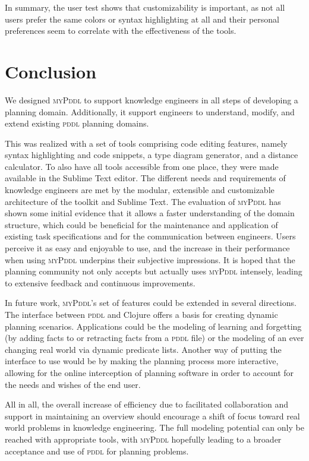 \documentclass[runningheads]{llncs}
\newcommand{\mypddl}{\textsc{myPddl}\xspace}
\newcommand{\pddl}{\textsc{pddl}\xspace}
\begin{document}
In summary, the user test shows that customizability is important, as
not all users prefer the same colors or syntax highlighting at all and
their personal preferences seem to correlate with the effectiveness of
the tools.


\section{Conclusion}
\label{sec:conclusion}

We designed \mypddl to support knowledge engineers in all steps of
developing a planning domain. Additionally, it support engineers to
understand, modify, and extend existing \pddl planning domains.

This was realized with a set of tools comprising code editing
features, namely syntax highlighting and code snippets, a type diagram
generator, and a distance calculator. To also have all tools
accessible from one place, they were made available in the Sublime
Text editor. The different needs and requirements of knowledge
engineers are met by the modular, extensible and customizable
architecture of the toolkit and Sublime Text. The evaluation of
\mypddl has shown some initial evidence that it allows a faster
understanding of the domain structure, which could be beneficial for
the maintenance and application of existing task specifications and
for the communication between engineers. Users perceive it as easy and
enjoyable to use, and the increase in their performance when using
\mypddl underpins their subjective impressions. It is hoped that the
planning community not only accepts but actually uses \mypddl
intensely, leading to extensive feedback and continuous improvements.

In future work, \mypddl's set of features could be extended in several
directions.  The interface between \pddl and Clojure offers a basis
for creating dynamic planning scenarios. Applications could be the modeling of
learning and forgetting (by adding facts to or retracting facts from a
\pddl file) or the modeling of an ever changing real world via dynamic
predicate lists. Another way of putting the interface to use would be
by making the planning process more interactive, allowing for the
online interception of planning software in order to account for the
needs and wishes of the end user.

All in all, the overall increase of efficiency due to facilitated
collaboration and support in maintaining an overview should encourage
a shift of focus toward real world problems in knowledge
engineering. The full modeling potential can only be reached with
appropriate tools, with \mypddl hopefully leading to a broader
acceptance and use of \pddl for planning problems.



\end{document}

